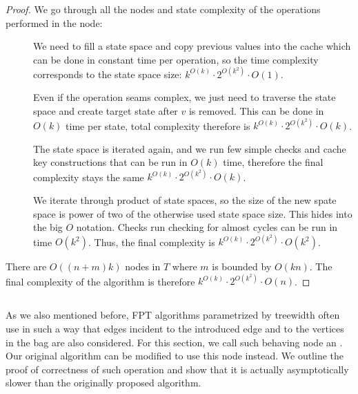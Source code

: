 \begin{proof}
	We go through all the nodes and state complexity of the operations performed in the node:
	\begin{description}
		\item[\IntroduceVertexNode{}]
		      We need to fill a state space and copy previous values into the cache
		      which can be done in constant time per operation,
		      so the time complexity corresponds to the state space size:
		      \( {k}^{O(k)} \cdot 2^{O(k^2)} \cdot O(1) \).
		\item[\ForgetVertexNode{}]
		      Even if the operation seams complex, we just need to traverse the state space
		      and create target state after \( v \) is removed. This can be done in \( O(k) \) time
		      per state, total complexity therefore is
		      \( {k}^{O(k)} \cdot 2^{O(k^2)} \cdot O(k) \).
		\item[\IntroduceEdgeNode{}]
		      The state space is iterated again, and we run few simple checks and cache key constructions
		      that can be run in \( O(k) \) time, therefore the final complexity stays the same
		      \( {k}^{O(k)} \cdot 2^{O(k^2)} \cdot O(k) \).
		\item[\JoinNode{}]
		      We iterate through product of state spaces,
		      so the size of the new spate space is power of two
		      of the otherwise used state space size.
		      This hides into the big \( O \) notation.
		      Checks run checking for almost cycles can be run in time \( O(k^2) \).
		      Thus, the final		complexity is
		      \( {k}^{O(k)} \cdot 2^{O(k^2)} \cdot O(k^2) \).
	\end{description}
	There are \( O((n+m)k) \) nodes in \( T \) where \( m \) is bounded by \( O(kn) \).
	The final complexity of the algorithm is therefore
	\( {k}^{O(k)} \cdot 2^{O(k^2)} \cdot O(n) \).
\end{proof}
%


\subsection{\IntroduceVertexWithEdgesNode{}}

As we also mentioned before, FPT algorithms parametrized by treewidth
often use \IntroduceVertexNode{} in such a way
that edges incident to the introduced edge and to
the vertices in the bag are also considered.
For this section, we call such behaving node an \IntroduceVertexWithEdgesNode{}.
Our original algorithm can be modified to use this node instead.
We outline the proof of correctness of such operation and show
that it is actually asymptotically slower than the originally proposed algorithm.

